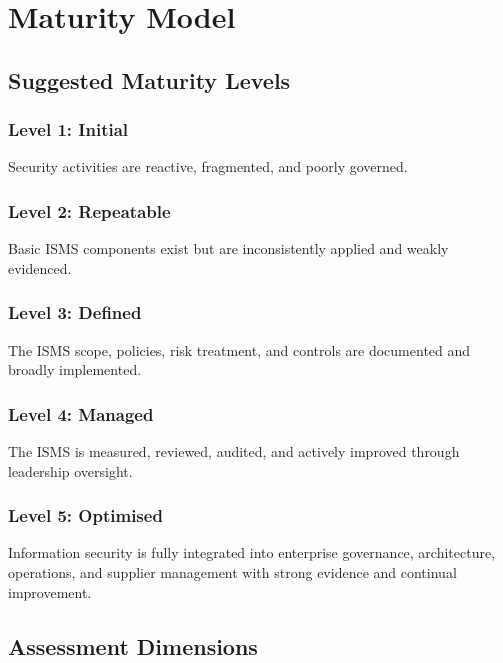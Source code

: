 \documentclass[
  letterpaper,
  DIV=11,
  numbers=noendperiod]{scrartcl}
\begin{document}
\section{Maturity Model}\label{maturity-model}

\subsection{Suggested Maturity Levels}\label{suggested-maturity-levels}

\subsubsection{Level 1: Initial}\label{level-1-initial}

Security activities are reactive, fragmented, and poorly governed.

\subsubsection{Level 2: Repeatable}\label{level-2-repeatable}

Basic ISMS components exist but are inconsistently applied and weakly
evidenced.

\subsubsection{Level 3: Defined}\label{level-3-defined}

The ISMS scope, policies, risk treatment, and controls are documented
and broadly implemented.

\subsubsection{Level 4: Managed}\label{level-4-managed}

The ISMS is measured, reviewed, audited, and actively improved through
leadership oversight.

\subsubsection{Level 5: Optimised}\label{level-5-optimised}

Information security is fully integrated into enterprise governance,
architecture, operations, and supplier management with strong evidence
and continual improvement.

\subsection{Assessment Dimensions}\label{assessment-dimensions}
\end{document}
